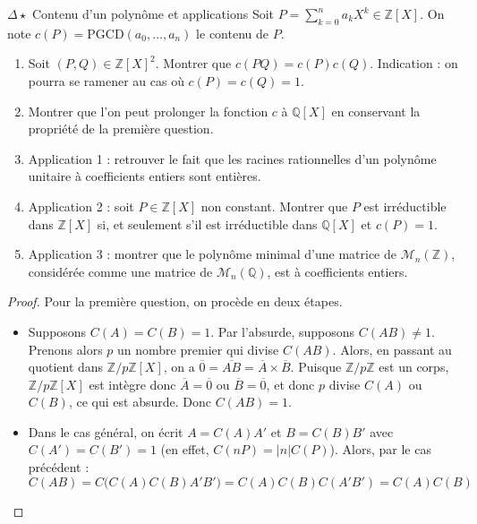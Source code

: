 \documentclass[french,a4paper]{article}
\newcommand{\Z}{\mathbb{Z}}
\newcommand{\Q}{\mathbb{Q}}
\theoremstyle{plain}
\theoremstyle{definition}
\theoremstyle{remark}
\begin{document}
\begin{ex}[Moulin.AG.72]{$\Delta\star$ Contenu d'un polynôme et applications}
	Soit $P=\displaystyle\sum_{k=0}^{n}a_kX^k\in\Z[X]$. On note $c(P)=\text{PGCD}(a_0,\ldots,a_n)$ le contenu de $P$.
	\begin{enumerate}
		\item Soit $(P,Q)\in\Z[X]^2$. Montrer que $c(PQ)=c(P)c(Q)$. Indication : on pourra se ramener au cas où $c(P)=c(Q)=1$.
		\item Montrer que l'on peut prolonger la fonction $c$ à $\Q[X]$ en conservant la propriété de la première question.
		\item Application 1 : retrouver le fait que les racines rationnelles d'un polynôme unitaire à coefficients entiers sont entières.
		\item Application 2 : soit $P\in\Z[X]$ non constant. Montrer que $P$ est irréductible dans $\Z[X]$ si, et seulement s'il est irréductible dans $\Q[X]$ et $c(P)=1$.
		\item Application 3 : montrer que le polynôme minimal d'une matrice de $\mathcal{M}_n(\Z)$, considérée comme une matrice de $\mathcal{M}_n(\Q)$, est à coefficients entiers.
	\end{enumerate}
\end{ex}
\begin{proof}
	Pour la première question, on procède en deux étapes.
	\begin{itemize}
		\item Supposons $C(A)=C(B)=1$. Par l'absurde, supposons $C(AB)\ne 1$. Prenons alors $p$ un nombre premier qui divise $C(AB)$. Alors, en passant au quotient dans $\Z/p\Z[X]$, on a $\overline{0}=\overline{AB}=\overline{A}\times\overline{B}$. Puisque $\Z/p\Z$ est un corps, $\Z/p\Z[X]$ est intègre donc $\overline{A}=\overline{0}$ ou $\overline{B}=\overline{0}$, et donc $p$ divise $C(A)$ ou $C(B)$, ce qui est absurde. Donc $C(AB)=1$.
		\item Dans le cas général, on écrit $A=C(A)A'$ et $B=C(B)B'$ avec $C(A')=C(B')=1$ (en effet, $C(nP)=\lvert n\rvert C(P)$). Alors, par le cas précédent : $$C(AB)=C\big(C(A)C(B)A'B'\big)=C(A)C(B)C(A'B')=C(A)C(B)$$
	\end{itemize}
\end{proof}
\end{document}
